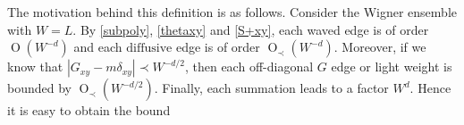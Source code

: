 \documentclass{article}
\newcommand{\1}{\mathds{1}}
\numberwithin{equation}{section}
\newcommand{\e}{{\varepsilon}}
\renewcommand{\cal}{\mathcal}
\newcommand{\dashed}{\text{diffusive}}
\DeclareMathOperator{\OO}{O}
\theoremstyle{plain} %
\theoremstyle{remark}
\newtheorem{remark}[theorem]{Remark}
\newcommand{\cor}{\color{red}}
\newcommand{\hty}[1]{{\cor (ht: #1) }}
\begin{document}
The motivation behind this definition is as follows. Consider the Wigner ensemble with $W=L$. 
By \eqref{subpoly}, \eqref{thetaxy} and \eqref{S+xy}, each waved edge is of order $\OO(W^{-d})$ and each $\dashed$ edge is of order $\OO_\prec(W^{-d})$. %
Moreover, if we know that $|G_{xy}-m\delta_{xy}|\prec W^{-d/2}$, then each off-diagonal $G$ edge or light weight is bounded by $\OO_\prec(W^{-d/2})$.  Finally, each summation leads to a factor $W^d$. Hence it is easy to obtain the bound %
\end{document}
